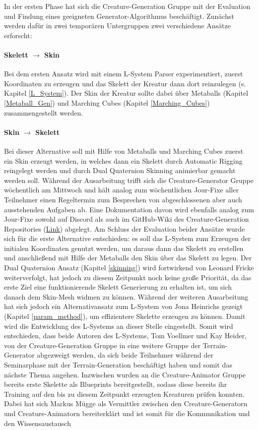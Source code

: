 In der ersten Phase hat sich die Creature-Generation Gruppe mit der Evaluation und Findung eines geeigneten Generator-Algorithmus beschäftigt. Zunächst werden dafür in zwei temporären Untergruppen zwei verschiedene Ansätze erforscht:

\paragraph{Skelett $\rightarrow$ Skin} Bei dem ersten Ansatz wird mit einem L-System Parser experimentiert, zuerst Koordinaten zu erzeugen und das Skelett der Kreatur dann dort reinzulegen (s. Kapitel \ref{L_System}). Der Skin der Kreatur sollte dabei über Metaballs (Kapitel \ref{Metaball_Gen}) und Marching Cubes (Kapitel \ref{Marching_Cubes}) zusammengestellt werden.

\paragraph{Skin $\rightarrow$ Skelett} Bei dieser Alternative soll mit Hilfe von Metaballs und Marching Cubes zuerst ein Skin erzeugt werden, in welches dann ein Skelett durch Automatic Rigging reingelegt werden und durch Dual Quaternion Skinning animierbar gemacht werden soll. Während der Ausarbeitung trifft sich die Creature-Generator Gruppe wöchentlich am Mittwoch und hält analog zum wöchentlichen Jour-Fixe aller Teilnehmer einen Regeltermin zum Besprechen von abgeschlossenen aber auch ausstehenden Aufgaben ab. Eine Dokumentation davon wird ebenfalls analog zum Jour-Fixe sowohl auf Discord als auch im GitHub-Wiki des Creature-Generation Repositories (\href{https://github.com/PG649-3D-RPG/Creature-Generation/wiki/Mittwochs-Dokumentationen-CG}{Link}) abgelegt. Am Schluss der Evaluation beider Ansätze wurde sich für die erste Alternative entschieden: es soll das L-System zum Erzeugen der initialen Koordinaten genutzt werden, um daraus dann das Skelett zu erstellen und anschließend mit Hilfe der Metaballs den Skin über das Skelett zu legen. Der Dual Quaternion Ansatz (Kapitel \ref{skinning}) wird fortwirkend von Leonard Fricke weiterverfolgt, hat jedoch zu diesem Zeitpunkt noch keine große Priorität, da das erste Ziel eine funktionierende Skelett Generierung zu erhalten ist, um sich danach dem Skin-Mesh widmen zu können. Während der weiteren Ausarbeitung hat sich jedoch ein Alternativansatz zum L-System von Jona Heinrichs gezeigt (Kapitel \ref{param_method}), um effizientere Skelette erzeugen zu können. Damit wird die Entwicklung des L-Systems an dieser Stelle eingestellt. Somit wird entschieden, dass beide Autoren des L-Systems, Tom Voellmer und Kay Heider, von der Creature-Generation Gruppe in eine weitere Gruppe der Terrain-Generator abgezweigt werden, da sich beide Teilnehmer während der Seminarphase mit der Terrain-Generation beschäftigt haben und somit das nächste Thema angehen. Inzwischen wurden an die Creature-Animator Gruppe bereits erste Skelette als Blueprints bereitgestellt, sodass diese bereits ihr Training auf den bis zu diesem Zeitpunkt erzeugten Kreaturen prüfen konnten. Dabei hat sich Markus Mügge als Vermittler zwischen den Creature-Generatorn und Creature-Animatorn bereiterklärt und ist somit für die Kommunikation und den Wissensaustausch 
